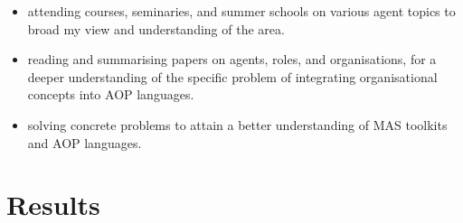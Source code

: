 \documentclass{article}
\begin{document}
\begin{itemize}
\item attending courses, seminaries, and summer schools on various agent topics
to broad my view and understanding of the area.

\item reading and summarising papers on agents, roles, and organisations, for a
deeper understanding of the specific problem of integrating organisational
concepts into AOP languages.

\item solving concrete problems to attain a better understanding of MAS
toolkits and AOP languages.

\end{itemize}

\section{Results}
\end{document}
